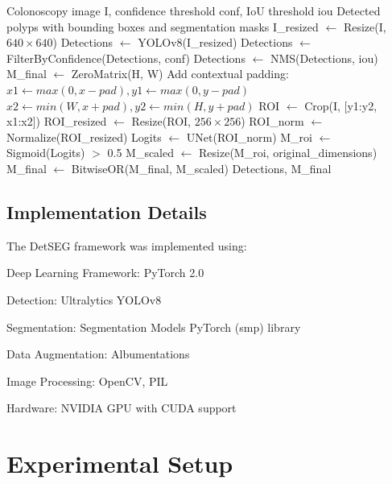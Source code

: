 \documentclass[runningheads]{llncs}
\begin{document}
\begin{algorithm}[H]
\caption{DetSEG Inference Pipeline}
\label{alg:inference}
\begin{algorithmic}[1]
\REQUIRE Colonoscopy image I, confidence threshold conf, IoU threshold iou
\ENSURE Detected polyps with bounding boxes and segmentation masks
\STATE I\_resized $\leftarrow$ Resize(I, $640\times640$)
\STATE Detections $\leftarrow$ YOLOv8(I\_resized)
\STATE Detections $\leftarrow$ FilterByConfidence(Detections, conf)
\STATE Detections $\leftarrow$ NMS(Detections, iou)
\STATE M\_final $\leftarrow$ ZeroMatrix(H, W)
    \STATE Add contextual padding:
    \STATE $x1 \leftarrow max(0, x-pad), y1 \leftarrow max(0, y-pad)$
    \STATE $x2 \leftarrow min(W, x+pad), y2 \leftarrow min(H, y+pad)$
    \STATE ROI $\leftarrow$ Crop(I, [y1:y2, x1:x2])
    \STATE ROI\_resized $\leftarrow$ Resize(ROI, $256\times256$)
    \STATE ROI\_norm $\leftarrow$ Normalize(ROI\_resized)
    \STATE Logits $\leftarrow$ UNet(ROI\_norm)
    \STATE M\_roi $\leftarrow$ Sigmoid(Logits) $>$ 0.5
    \STATE M\_scaled $\leftarrow$ Resize(M\_roi, original\_dimensions)
    \STATE M\_final $\leftarrow$ BitwiseOR(M\_final, M\_scaled)
\ENDFOR
\RETURN Detections, M\_final
\end{algorithmic}
\end{algorithm}

\subsection{Implementation Details}
The DetSEG framework was implemented using:

\noindent Deep Learning Framework: PyTorch 2.0

\noindent Detection: Ultralytics YOLOv8

\noindent Segmentation: Segmentation Models PyTorch (smp) library

\noindent Data Augmentation: Albumentations

\noindent Image Processing: OpenCV, PIL

\noindent Hardware: NVIDIA GPU with CUDA support

\section{Experimental Setup}
\end{document}
